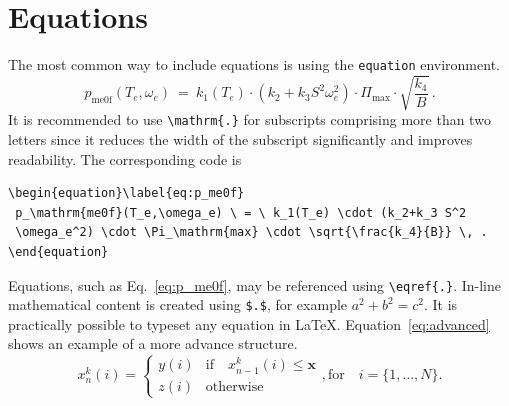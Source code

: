 \section{Equations}\label{sec:math}
The most common way to include equations is using the \texttt{equation} environment.
\begin{equation}\label{eq:p_me0f}
 p_\mathrm{me0f}(T_e,\omega_e) \ = \ k_1(T_e) \cdot (k_2+k_3 S^2
 \omega_e^2) \cdot \Pi_\mathrm{max} \cdot \sqrt{\frac{k_4}{B}} \, .
\end{equation}
It is recommended to use \texttt{\textbackslash mathrm\{.\}} for subscripts comprising more than two letters since it reduces the width of the subscript significantly and improves readability. The corresponding code is
\begin{verbatim}
\begin{equation}\label{eq:p_me0f}
 p_\mathrm{me0f}(T_e,\omega_e) \ = \ k_1(T_e) \cdot (k_2+k_3 S^2
 \omega_e^2) \cdot \Pi_\mathrm{max} \cdot \sqrt{\frac{k_4}{B}} \, .
\end{equation}
\end{verbatim}
Equations, such as Eq.~\eqref{eq:p_me0f}, may be referenced using \texttt{\textbackslash eqref\{.\}}. In-line mathematical content is created using \texttt{\$.\$}, for example $a^2+b^2=c^2$. It is practically possible to typeset any equation in \LaTeX. Equation~\eqref{eq:advanced} shows an example of a more advance structure.
\begin{equation}\label{eq:advanced}
x^k_n(i) = \left\{\begin{array}{ll}y(i) & \text{if}\quad x^k_{n-1}(i)\leq \mathbf{x}\\
z(i) & \text{otherwise}\end{array}\right., \text{for}\quad i=\{1,\ldots,N\}.
\end{equation}



